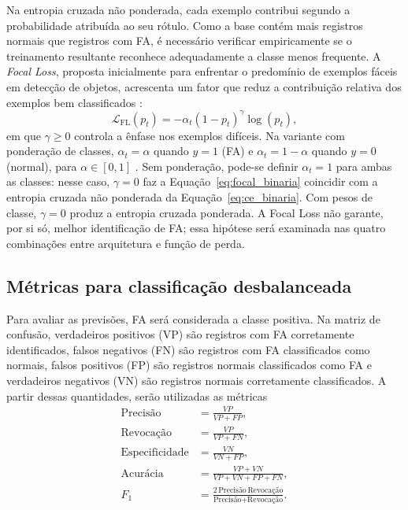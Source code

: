 \documentclass[
    12pt,                %
    openright,           %
    oneside,             %
    a4paper,             %
    english,             %
    brazil               %
]{abntex2}
\begin{document}
Na entropia cruzada não ponderada, cada exemplo contribui segundo a probabilidade atribuída ao seu rótulo. Como a base contém mais registros normais que registros com FA, é necessário verificar empiricamente se o treinamento resultante reconhece adequadamente a classe menos frequente. A \textit{Focal Loss}, proposta inicialmente para enfrentar o predomínio de exemplos fáceis em detecção de objetos, acrescenta um fator que reduz a contribuição relativa dos exemplos bem classificados \cite{Lin2017}:
\begin{equation}
    \mathcal{L}_{\mathrm{FL}}(p_t)=-\alpha_t(1-p_t)^{\gamma}\log(p_t),
    \label{eq:focal_binaria}
\end{equation}
em que $\gamma\geq0$ controla a ênfase nos exemplos difíceis. Na variante com ponderação de classes, $\alpha_t=\alpha$ quando $y=1$ (FA) e $\alpha_t=1-\alpha$ quando $y=0$ (normal), para $\alpha\in[0,1]$ \cite{Lin2017}. Sem ponderação, pode-se definir $\alpha_t=1$ para ambas as classes: nesse caso, $\gamma=0$ faz a Equação~\ref{eq:focal_binaria} coincidir com a entropia cruzada não ponderada da Equação~\ref{eq:ce_binaria}. Com pesos de classe, $\gamma=0$ produz a entropia cruzada ponderada. A Focal Loss não garante, por si só, melhor identificação de FA; essa hipótese será examinada nas quatro combinações entre arquitetura e função de perda.

\subsection{Métricas para classificação desbalanceada}
\label{subsec:metricas}

Para avaliar as previsões, FA será considerada a classe positiva. Na matriz de confusão, verdadeiros positivos (VP) são registros com FA corretamente identificados, falsos negativos (FN) são registros com FA classificados como normais, falsos positivos (FP) são registros normais classificados como FA e verdadeiros negativos (VN) são registros normais corretamente classificados. A partir dessas quantidades, serão utilizadas as métricas
\begin{align}
    \text{Precisão} &= \frac{VP}{VP+FP}, \nonumber\\
    \text{Revocação} &= \frac{VP}{VP+FN}, \nonumber\\
    \text{Especificidade} &= \frac{VN}{VN+FP}, \nonumber\\
    \text{Acurácia} &= \frac{VP+VN}{VP+VN+FP+FN}, \nonumber\\
    F_1 &= \frac{2\,\text{Precisão}\,\text{Revocação}}{\text{Precisão}+\text{Revocação}}. \label{eq:metricas}
\end{align}
\end{document}
